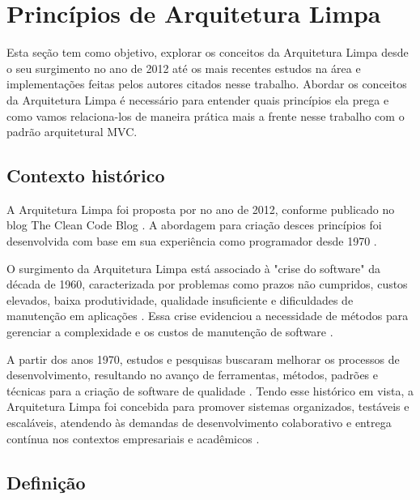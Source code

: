 \section{Princípios de Arquitetura Limpa}

    \par Esta seção tem como objetivo, explorar os conceitos da Arquitetura Limpa desde o seu surgimento no ano de 2012 até os mais recentes estudos na área e implementações feitas pelos autores citados nesse trabalho. Abordar os conceitos da Arquitetura Limpa é necessário para entender quais princípios ela prega e como vamos relaciona-los de maneira prática mais a frente nesse trabalho com o padrão arquitetural MVC.
    
    \subsection{Contexto histórico}
    
        \par A Arquitetura Limpa foi proposta por \cite{livro:martin:cleanarch} no ano de 2012, conforme publicado no blog The Clean Code Blog \cite{artigo:ferreira:2022}. A abordagem para criação desces princípios foi desenvolvida com base em sua experiência como programador desde 1970 \cite{livro:martin:cleanarch}.
        
        \par O surgimento da Arquitetura Limpa está associado à "crise do software" da década de 1960, caracterizada por problemas como prazos não cumpridos, custos elevados, baixa produtividade, qualidade insuficiente e dificuldades de manutenção em aplicações \cite{artigo:dantas:2021, artigo:ferreira:2022}. Essa crise evidenciou a necessidade de métodos para gerenciar a complexidade e os custos de manutenção de software \cite{livro:martin:cleanarch}.

        \par A partir dos anos 1970, estudos e pesquisas buscaram melhorar os processos de desenvolvimento, resultando no avanço de ferramentas, métodos, padrões e técnicas para a criação de software de qualidade \cite{artigo:dantas:2021}. Tendo esse histórico em vista, a Arquitetura Limpa foi concebida para promover sistemas organizados, testáveis e escaláveis, atendendo às demandas de desenvolvimento colaborativo e entrega contínua nos contextos empresariais e acadêmicos \cite{artigo:ferreira:2022}.
        
    \subsection{Definição}

